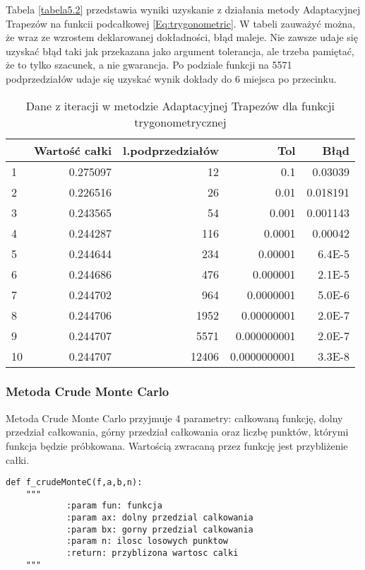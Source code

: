 \documentclass[12pt,twoside]{article}
\begin{document}
Tabela \eqref{tabela5.2} przedstawia wyniki uzyskanie z działania metody Adaptacyjnej Trapezów na funkcii podcałkowej \eqref{Eq:trygonometric}. W tabeli zauważyć można, że wraz ze wzrostem deklarowanej dokładności, błąd maleje. Nie zawsze udaje się uzyskać błąd taki jak przekazana jako argument tolerancja, ale trzeba pamiętać, że to tylko szacunek, a nie gwarancja. Po podziale funkcji na 5571 podprzedziałów udaje się uzyskać wynik dokłady do 6 miejsca po przecinku.


\begin{table}[H]
\centering 
\caption{Dane z iteracji w metodzie Adaptacyjnej Trapezów dla funkcji trygonometrycznej}
\label{tabela5.2}
\begin{tabular}{lrrrr}
\toprule
{} &  Wartość całki &  l.podprzedziałów &  Tol &      Błąd \\
\midrule
1 &       0.275097 &  12  &   0.1 & 0.03039 \\
2 &       0.226516 &  26 &   0.01 & 0.018191 \\
3 &       0.243565 &  54  &  0.001 & 0.001143 \\
4 &       0.244287 &  116  &  0.0001  & 0.00042 \\
5 &       0.244644 &  234  &  0.00001  & 6.4E-5 \\
6 &       0.244686 &  476  &  0.000001  & 2.1E-5 \\
7 &       0.244702 &  964  &  0.0000001  & 5.0E-6 \\
8 &       0.244706 &  1952  &  0.00000001  & 2.0E-7 \\
9 &       0.244707 & 5571  &  0.000000001  & 2.0E-7 \\
10 &       0.244707 & 12406  & 0.0000000001  & 3.3E-8 \\

\bottomrule
\end{tabular}
\end{table}

\subsubsection{Metoda Crude Monte Carlo}

Metoda Crude Monte Carlo przyjmuje 4 parametry: całkowaną funkcję, dolny przedział całkowania, górny przedział całkowania oraz liczbę punktów, którymi funkcja będzie próbkowana. 
Wartością zwracaną przez funkcję jest przybliżenie całki.

\begin{lstlisting}[caption={Kod w języku python implementujący metodę Crude Monte Carlo}]
def f_crudeMonteC(f,a,b,n):
    """
    		:param fun: funkcja
            :param ax: dolny przedzial calkowania
            :param bx: gorny przedzial calkowania
            :param n: ilosc losowych punktow
            :return: przyblizona wartosc calki
    """
\end{lstlisting}
\label{Listing 11}
\end{document}
